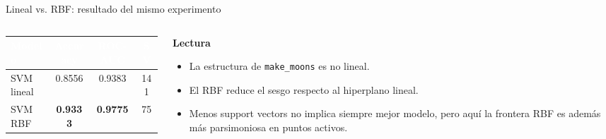 \begin{frame}{Lineal vs. RBF: resultado del mismo experimento}
\begin{columns}[T,onlytextwidth]
\begin{column}{0.58\textwidth}
\vspace{1.55cm}
\renewcommand{\arraystretch}{1.45}
\small
\begin{tabular}{lccc}
\toprule
\rowcolor{ccdenavy}
\textcolor{white}{\textbf{Modelo}} &
\textcolor{white}{\textbf{Accuracy}} &
\textcolor{white}{\textbf{ROC-AUC}} &
\textcolor{white}{\textbf{SV}}\\
\midrule
SVM lineal & 0.8556 & 0.9383 & 141\\
\rowcolor{ccdeice!50}
SVM RBF & \textbf{0.9333} & \textbf{0.9775} & 75\\
\bottomrule
\end{tabular}
\end{column}
\begin{column}{0.38\textwidth}
\begin{keybox}
\textbf{Lectura}
\begin{itemize}
  \item La estructura de \texttt{make\_moons} es no lineal.
  \item El RBF reduce el sesgo respecto al hiperplano lineal.
  \item Menos support vectors no implica siempre mejor modelo, pero aquí la frontera RBF es además más parsimoniosa en puntos activos.
\end{itemize}
\end{keybox}
\end{column}
\end{columns}
\end{frame}

